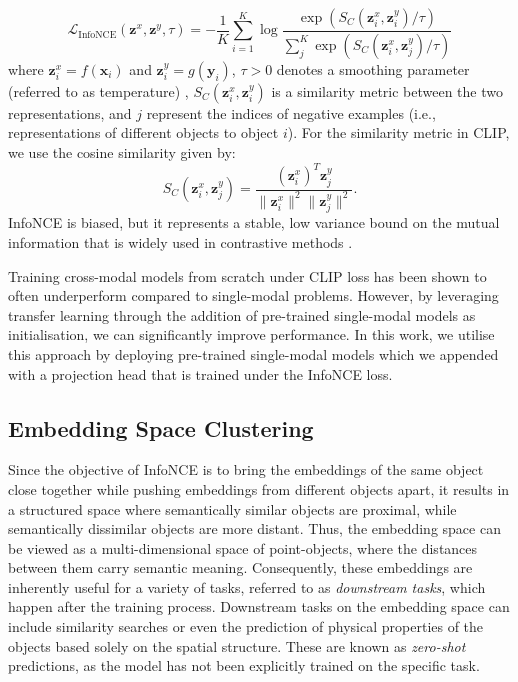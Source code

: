 \documentclass[a4paper,12pt]{article}
\begin{document}
\begin{equation}
    \mathcal{L}_{\text{InfoNCE}}(\mathbf{z}^x, \mathbf{z}^y, \tau) = -\frac{1}{K} \sum_{i=1}^{K} \log \frac{\exp\left(S_C(\mathbf{z}^x_i, \mathbf{z}^y_i)/\tau\right)}{\sum_{j}^{K} \exp\left(S_C(\mathbf{z}^x_i, \mathbf{z}^y_j)/\tau\right)}
    \label{eq:infonce}
\end{equation}
where $\mathbf{z}^x_i=f(\mathbf{x}_i)$ and $\mathbf{z}^y_i=g(\mathbf{y}_i)$, $\tau > 0$ denotes a smoothing parameter (referred to as temperature) , $S_C(\mathbf{z}^x_i, \mathbf{z}^y_i)$ is a similarity metric between the two representations, and $j$ represent the indices of negative examples (i.e., representations of different objects to object $i$). For the similarity metric in CLIP, we use the cosine similarity given by:
\begin{equation}
    S_C(\mathbf{z}^x_i, \mathbf{z}^y_j) = \frac{(\mathbf{z}^x_i)^T \mathbf{z}^y_j}{\|\mathbf{z}^x_i\|^2 \|\mathbf{z}^y_j\|^2}.
    \label{eq:cosine}
\end{equation}
InfoNCE is biased, but it represents a stable, low variance bound on the mutual information that is widely used in contrastive methods \cite{crossCLIP}. 

Training cross-modal models from scratch under CLIP loss has been shown to often underperform compared to single-modal problems. However, by leveraging transfer learning through the addition of pre-trained single-modal models as initialisation, we can significantly improve performance. In this work, we utilise this approach by deploying pre-trained single-modal models which we appended with a projection head that is trained under the InfoNCE loss. 


\subsection{Embedding Space Clustering}
\label{sec:downstream}
Since the objective of InfoNCE is to bring the embeddings of the same object close together while pushing embeddings from different objects apart, it results in a structured space where semantically similar objects are proximal, while semantically dissimilar objects are more distant. Thus, the embedding space can be viewed as a multi-dimensional space of point-objects, where the distances between them carry semantic meaning. Consequently, these embeddings are inherently useful for a variety of tasks, referred to as \emph{downstream tasks}, which happen after the training process. Downstream tasks on the embedding space can include similarity searches or even the prediction of physical properties of the objects based solely on the spatial structure. These are known as \emph{zero-shot} predictions, as the model has not been explicitly trained on the specific task.
 
\end{document}
